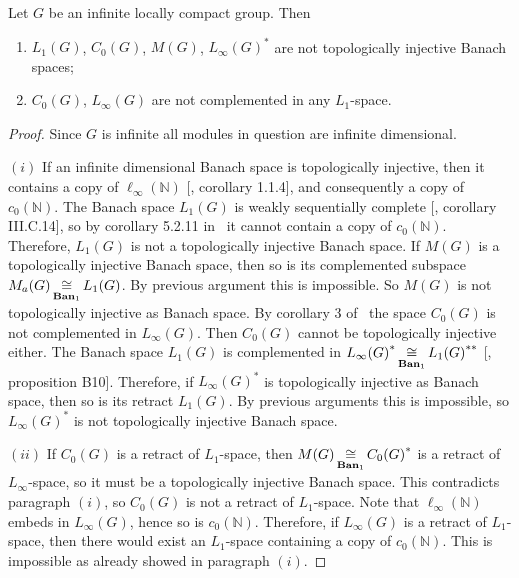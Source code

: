 \begin{proposition}\label{StdModAreNotRetrOfL1LInf} Let $G$ be an infinite
locally compact group. Then

\begin{enumerate}[label = (\roman*)]
    \item $L_1(G)$, $C_0(G)$, $M(G)$, ${L_\infty(G)}^*$ are not 
    topologically injective Banach spaces;

    \item $C_0(G)$, $L_\infty(G)$ are not complemented in any $L_1$-space.
\end{enumerate}
\end{proposition}
\begin{proof}
Since $G$ is infinite all modules in question are infinite dimensional.

$(i)$ If an infinite dimensional Banach space is topologically injective, then it
contains a copy of $\ell_\infty(\mathbb{N})$ [\cite{RosOnRelDisjFamOfMeas},
corollary 1.1.4], and consequently a copy of $c_0(\mathbb{N})$. The Banach space
$L_1(G)$ is weakly sequentially complete [\cite{WojBanSpForAnalysts}, corollary
III.C.14], so by corollary 5.2.11 in~\cite{KalAlbTopicsBanSpTh} it cannot contain
a copy of $c_0(\mathbb{N})$. Therefore, $L_1(G)$ is not a topologically injective
Banach space.  If $M(G)$ is a topologically injective Banach space, then so is
its complemented subspace $M_a(G)\mathop{\mathbin{\cong}}\limits_{\mathbf{Ban}_1}L_1(G)$. By previous
argument this is impossible. So $M(G)$ is not topologically injective as Banach
space. By corollary 3 of~\cite{LauMingComplSubspInLInfOfG} the space $C_0(G)$ is
not complemented in $L_\infty(G)$. Then $C_0(G)$ cannot be topologically
injective either. The Banach space $L_1(G)$ is complemented in
${L_\infty(G)}^*\mathop{\mathbin{\cong}}\limits_{\mathbf{Ban}_1}{L_1(G)}^{**}$ [\cite{DefFloTensNorOpId},
proposition  B10]. Therefore, if ${L_\infty(G)}^*$ is topologically injective as
Banach space, then so is its retract $L_1(G)$. By previous arguments this is
impossible, so ${L_\infty(G)}^*$ is not topologically injective Banach space.

$(ii)$ If $C_0(G)$ is a retract of $L_1$-space, then
$M(G)\mathop{\mathbin{\cong}}\limits_{\mathbf{Ban}_1}{C_0(G)}^*$ is a retract of $L_\infty$-space, 
so it must be a topologically injective Banach space. This contradicts 
paragraph $(i)$, so $C_0(G)$ is not a retract of $L_1$-space. 
Note that $\ell_\infty(\mathbb{N})$ embeds in $L_\infty(G)$, hence so 
is $c_0(\mathbb{N})$. Therefore, if $L_\infty(G)$ is
a retract of $L_1$-space, then there would exist an $L_1$-space containing a
copy of $c_0(\mathbb{N})$. This is impossible as already showed in paragraph
$(i)$.
\end{proof}

